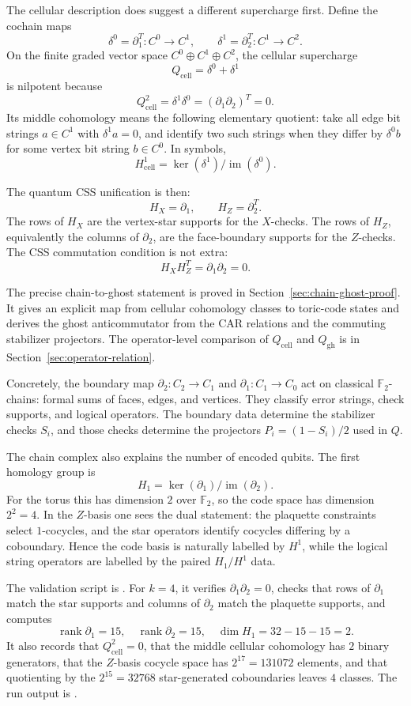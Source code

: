 The cellular description does suggest a different supercharge first. Define
the cochain maps
\[
  \delta^0=\partial_1^T:C^0\to C^1,\qquad
  \delta^1=\partial_2^T:C^1\to C^2 .
\]
On the finite graded vector space \(C^0\oplus C^1\oplus C^2\), the cellular
supercharge
\[
  Q_{\mathrm{cell}}=\delta^0+\delta^1
\]
is nilpotent because
\[
  Q_{\mathrm{cell}}^2=\delta^1\delta^0
  =(\partial_1\partial_2)^T=0 .
\]
Its middle cohomology means the following elementary quotient: take all edge
bit strings \(a\in C^1\) with \(\delta^1 a=0\), and identify two such strings
when they differ by \(\delta^0 b\) for some vertex bit string \(b\in C^0\).
In symbols,
\[
  H^1_{\mathrm{cell}}=\ker(\delta^1)/\operatorname{im}(\delta^0).
\]

The quantum CSS unification is then:
\[
  H_X = \partial_1,\qquad H_Z=\partial_2^T .
\]
The rows of \(H_X\) are the vertex-star supports for the \(X\)-checks. The rows
of \(H_Z\), equivalently the columns of \(\partial_2\), are the face-boundary
supports for the \(Z\)-checks. The CSS commutation condition is not extra:
\[
  H_X H_Z^T = \partial_1\partial_2 = 0 .
\]

The precise chain-to-ghost statement is proved in
Section~\ref{sec:chain-ghost-proof}. It gives an explicit map from cellular
cohomology classes to toric-code states and derives the ghost
anticommutator from the CAR relations and the commuting stabilizer projectors.
The operator-level comparison of \(Q_{\mathrm{cell}}\) and \(Q_{\mathrm{gh}}\)
is in Section~\ref{sec:operator-relation}.

Concretely, the boundary map
\(\partial_2:C_2\to C_1\) and \(\partial_1:C_1\to C_0\) act on classical
\(\mathbb{F}_2\)-chains: formal sums of faces, edges, and vertices. They
classify error strings, check supports, and logical operators. The
boundary data determine the stabilizer checks \(S_i\), and those checks
determine the projectors \(P_i=(1-S_i)/2\) used in \(Q\).

The chain complex also explains the number of encoded qubits. The first
homology group is
\[
  H_1=\ker(\partial_1)/\operatorname{im}(\partial_2).
\]
For the torus this has dimension \(2\) over \(\mathbb{F}_2\), so the code
space has dimension \(2^2=4\). In the \(Z\)-basis one sees the dual statement:
the plaquette constraints select \(1\)-cocycles, and the star operators
identify cocycles differing by a coboundary. Hence the code basis is naturally
labelled by \(H^1\), while the logical string operators are labelled by the
paired \(H_1/H^1\) data.

The validation script is
. For \(k=4\), it
verifies \(\partial_1\partial_2=0\), checks that rows of
\(\partial_1\) match the star supports and columns of \(\partial_2\) match the
plaquette supports, and computes
\[
  \operatorname{rank}\partial_1=15,\quad
  \operatorname{rank}\partial_2=15,\quad
  \dim H_1 = 32-15-15=2 .
\]
It also records that \(Q_{\mathrm{cell}}^2=0\), that the middle cellular
cohomology has \(2\) binary generators, that the \(Z\)-basis cocycle space has
\(2^{17}=131072\) elements, and that quotienting by the \(2^{15}=32768\)
star-generated coboundaries leaves \(4\) classes.
The run output is
.
